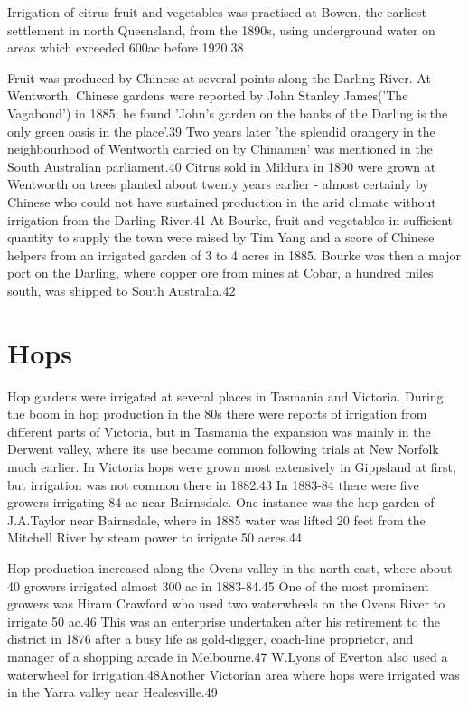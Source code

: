 Irrigation of citrus fruit and vegetables was practised at Bowen, the
earliest settlement in north Queensland, from the 1890s, using
underground water on areas which exceeded 600ac before 1920.38

Fruit was produced by Chinese at several points along the Darling
River. At Wentworth, Chinese gardens were reported by John Stanley
James('The Vagabond') in 1885; he found 'John's garden on the banks of
the Darling is the only green oasis in the place'.39 Two years later
'the splendid orangery in the neighbourhood of Wentworth carried on by
Chinamen' was mentioned in the South Australian parliament.40 Citrus
sold in Mildura in 1890 were grown at Wentworth on trees planted about
twenty years earlier - almost certainly by Chinese who could not have
sustained production in the arid climate without irrigation from the
Darling River.41 At Bourke, fruit and vegetables in sufficient
quantity to supply the town were raised by Tim Yang and a score of
Chinese helpers from an irrigated garden of 3 to 4 acres in
1885. Bourke was then a major port on the Darling, where copper ore
from mines at Cobar, a hundred miles south, was shipped to South
Australia.42

\section{Hops}

Hop gardens were irrigated at several places in Tasmania and
Victoria. During the boom in hop production in the 80s there were
reports of irrigation from different parts of Victoria, but in
Tasmania the expansion was mainly in the Derwent valley, where its use
became common following trials at New Norfolk much earlier. In
Victoria hops were grown most extensively in Gippsland at first, but
irrigation was not common there in 1882.43 In 1883-84 there were five
growers irrigating 84 ac near Bairnsdale. One instance was the
hop-garden of J.A.Taylor near Bairnsdale, where in 1885 water was
lifted 20 feet from the Mitchell River by steam power to irrigate 50
acres.44

Hop production increased along the Ovens valley in the north-east,
where about 40 growers irrigated almost 300 ac in 1883-84.45 One of
the most prominent growers was Hiram Crawford who used two waterwheels
on the Ovens River to irrigate 50 ac.46 This was an enterprise
undertaken after his retirement to the district in 1876 after a busy
life as gold-digger, coach-line proprietor, and manager of a shopping
arcade in Melbourne.47 W.Lyons of Everton also used a waterwheel for
irrigation.48Another Victorian area where hops were irrigated was in
the Yarra valley near Healesville.49

